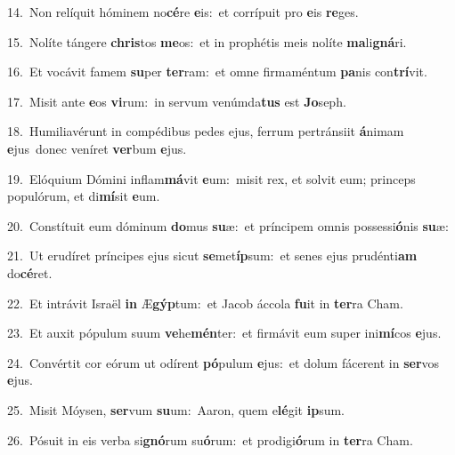 {\numbfont\textcolor{\numbcolor}{14.}}~Non relíquit hóminem no\-\textbf{cé}\-re \textbf{e}\-is:~\star et corrípuit pro \textbf{e}\-is \textbf{re}\-ges.\par
{\numbfont\textcolor{\numbcolor}{15.}}~Nolíte tángere \textbf{chris}\-tos \textbf{me}\-os:~\star et in prophétis meis nolíte \textbf{ma}\-li\-\textbf{gná}\-ri.\par
{\numbfont\textcolor{\numbcolor}{16.}}~Et vocávit famem \textbf{su}\-per \textbf{ter}\-ram:~\star et omne firmaméntum \textbf{pa}\-nis con\-\textbf{trí}\-vit.\par
{\numbfont\textcolor{\numbcolor}{17.}}~Misit ante \textbf{e}\-os \textbf{vi}\-rum:~\star in servum venúmda\textbf{tus} est \textbf{Jo}\-seph.\par
{\numbfont\textcolor{\numbcolor}{18.}}~Humiliavérunt in compédibus pedes ejus, ferrum pertránsiit \textbf{á}\-nimam \textbf{e}\-jus~\star donec veníret \textbf{ver}\-bum \textbf{e}\-jus.\par
{\numbfont\textcolor{\numbcolor}{19.}}~Elóquium Dómini inflam\-\textbf{má}\-vit \textbf{e}\-um:~\star misit rex, et solvit eum; princeps populórum, et di\-\textbf{mí}\-sit \textbf{e}\-um.\par
{\numbfont\textcolor{\numbcolor}{20.}}~Constítuit eum dóminum \textbf{do}\-mus \textbf{su}\-æ:~\star et príncipem omnis possessi\-\textbf{ó}\-nis \textbf{su}\-æ:\par
{\numbfont\textcolor{\numbcolor}{21.}}~Ut erudíret príncipes ejus sicut \textbf{se}\-met\-\textbf{íp}\-sum:~\star et senes ejus prudénti\textbf{am} do\-\textbf{cé}\-ret.\par
{\numbfont\textcolor{\numbcolor}{22.}}~Et intrávit Israël \textbf{in} Æ\-\textbf{gýp}\-tum:~\star et Jacob áccola \textbf{fu}\-it in \textbf{ter}\-ra Cham.\par
{\numbfont\textcolor{\numbcolor}{23.}}~Et auxit pópulum suum \textbf{ve}\-he\-\textbf{mén}\-ter:~\star et firmávit eum super ini\-\textbf{mí}\-cos \textbf{e}\-jus.\par
{\numbfont\textcolor{\numbcolor}{24.}}~Convértit cor eórum ut odírent \textbf{pó}\-pulum \textbf{e}\-jus:~\star et dolum fácerent in \textbf{ser}\-vos \textbf{e}\-jus.\par
{\numbfont\textcolor{\numbcolor}{25.}}~Misit Móysen, \textbf{ser}\-vum \textbf{su}\-um:~\star Aaron, quem e\-\textbf{lé}\-git \textbf{ip}\-sum.\par
{\numbfont\textcolor{\numbcolor}{26.}}~Pósuit in eis verba si\-\textbf{gnó}\-rum su\-\textbf{ó}\-rum:~\star et prodigi\-\textbf{ó}\-rum in \textbf{ter}\-ra Cham.\par
